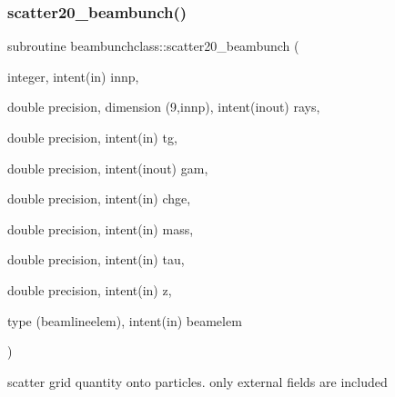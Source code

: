 \subsubsection{\texorpdfstring{scatter20\_beambunch()}{scatter20\_beambunch()}}
{\footnotesize\ttfamily subroutine beambunchclass\+::scatter20\+\_\+beambunch (\begin{DoxyParamCaption}\item[{integer, intent(in)}]{innp,  }\item[{double precision, dimension (9,innp), intent(inout)}]{rays,  }\item[{double precision, intent(in)}]{tg,  }\item[{double precision, intent(inout)}]{gam,  }\item[{double precision, intent(in)}]{chge,  }\item[{double precision, intent(in)}]{mass,  }\item[{double precision, intent(in)}]{tau,  }\item[{double precision, intent(in)}]{z,  }\item[{type (beamlineelem), intent(in)}]{beamelem }\end{DoxyParamCaption})}



scatter grid quantity onto particles. only external fields are included 

